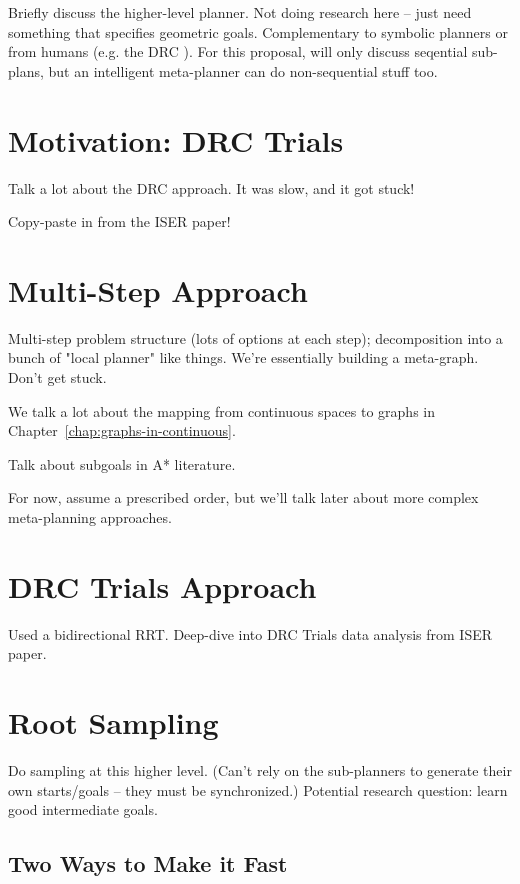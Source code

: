 Briefly discuss the higher-level planner.
Not doing research here -- just need something that specifies
geometric goals.
Complementary to symbolic planners
or from humans (e.g. the DRC \cite{dellin2014drc}).
For this proposal,
will only discuss seqential sub-plans,
but an intelligent meta-planner
can do non-sequential stuff too.

\section{Motivation: DRC Trials}

Talk a lot about the DRC approach.
It was slow, and it got stuck!

Copy-paste in from the ISER paper!

\section{Multi-Step Approach}

Multi-step problem structure (lots of options at each step);
decomposition into a bunch of "local planner" like things.
We're essentially building a meta-graph.
Don't get stuck.

We talk a lot about the mapping
from continuous spaces to graphs in
Chapter~\ref{chap:graphs-in-continuous}.

Talk about subgoals in A* literature.

For now, assume a prescribed order,
but we'll talk later about more complex meta-planning
approaches.

\section{DRC Trials Approach}

Used a bidirectional RRT.
Deep-dive into DRC Trials data analysis from ISER paper.

\section{Root Sampling}

Do sampling at this higher level.
(Can't rely on the sub-planners to generate their own starts/goals --
they must be synchronized.)
Potential research question: learn good intermediate goals.

\subsection{Two Ways to Make it Fast}

